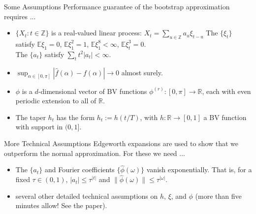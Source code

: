  \begin{frame}{Some Assumptions}
 Performance guarantee of the bootstrap approximation requires ...
 \begin{itemize}
 \item $\{X_t:t\in\mathbb Z\}$ is a real-valued linear process: $X_t = \sum_{u\in\mathbb Z} a_u \xi_{t-u}$ The $\{\xi_t\}$ satisfy $\mathbb E \xi_1 = 0$, $\mathbb E \xi_1^2 = 1$, $\mathbb E \xi_1^8 <\infty$, $\mathbb E \xi_t^3 = 0$. \\ The $\{a_t\}$ satisfy $\sum_t t^2 |a_t| < \infty$.
 \item $\sup_{\alpha\in[0,\pi]} |\hat f(\alpha) - f(\alpha)| \to 0$ almost surely.
 \item $\phi$ is a $d$-dimensional vector of BV functions $\phi^{(r)}:[0,\pi]\to\mathbb R$, each with even periodic extension to all of $\mathbb R$. 
 \item The taper $h_t$ has the form $h_t := h(t/T)$, with $h:\mathbb R\to[0,1]$ a BV function with support in $(0,1]$.
 \end{itemize}
 \end{frame}
 
 \begin{frame}{More Technical Assumptions}
Edgeworth expansions are used to show that we outperform the normal approximation. For these we need  ...
 \begin{itemize}
\item  The $\{a_t\}$ and Fourier coefficients $\{\hat\phi (\omega)\}$ vanish exponentially. That is, for a fixed $\tau \in (0,1)$, $|a_t| \le \tau^{|t|}$ and $\|\hat\phi(\omega)\| \le \tau^{|\omega|}$.
\item several other detailed technical assumptions on $h$, $\xi$, and $\phi$ (more than five minutes allow! See the paper).
 \end{itemize}
 \end{frame}
 
